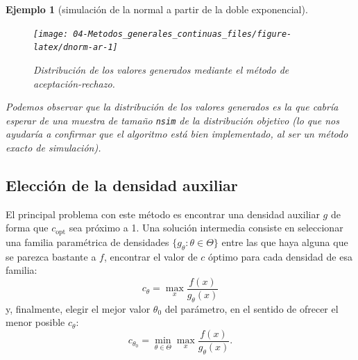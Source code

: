 \documentclass[
]{book}
\theoremstyle{break}
\newtheorem{example}{Ejemplo}[chapter]
\theoremstyle{nonumberplain}
\begin{document}
\begin{example}[simulación de la normal a partir de la doble exponencial]
\begin{figure}[!htb]

{\centering \texttt{[image: 04-Metodos\_generales\_continuas\_files/figure-latex/dnorm-ar-1]} 

}

\caption{Distribución de los valores generados mediante el método de aceptación-rechazo.}\label{fig:dnorm-ar}
\end{figure}

Podemos observar que la distribución de los valores generados es la que cabría esperar de una muestra de tamaño \texttt{nsim} de la distribución objetivo (lo que nos ayudaría a confirmar que el algoritmo está bien implementado, al ser un método exacto de simulación).
\end{example}

\hypertarget{elecciuxf3n-de-la-densidad-auxiliar}{%
\subsection{Elección de la densidad auxiliar}\label{elecciuxf3n-de-la-densidad-auxiliar}}

El principal problema con este método es encontrar una densidad auxiliar \(g\) de forma que \(c_{\text{opt}}\) sea próximo a 1.
Una solución intermedia consiste en seleccionar una familia paramétrica de densidades \(\{g_{\theta} : \theta \in \Theta\}\) entre las que haya alguna que se parezca bastante a \(f\),
encontrar el valor de \(c\) óptimo para cada densidad de esa familia:
\[c_{\theta}=\max_{x}\frac{f(x)  }{g_{\theta}(x) }\]
y, finalmente, elegir el mejor valor \(\theta_{0}\) del parámetro, en el sentido de ofrecer el menor posible \(c_{\theta}\):
\[c_{\theta_{0}}=\min_{\theta\in\Theta}\max_{x}\frac{f(x) }{g_{\theta}(x)}.\]
\end{document}
